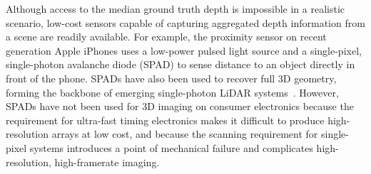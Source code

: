 




Although access to the median ground truth depth is impossible in a realistic scenario, low-cost sensors capable of capturing aggregated depth information from a scene are readily available. For example, the proximity sensor on recent generation Apple iPhones uses a low-power pulsed light source and a single-pixel, single-photon avalanche diode (SPAD) to sense distance to an object directly in front of the phone. SPADs have also been used to recover full 3D geometry, forming the backbone of emerging single-photon LiDAR systems~\cite{Kirmani:2014,Li:2019,pawlikowska2017single}. However, SPADs have not been used for 3D imaging on consumer electronics because the requirement for ultra-fast timing electronics makes it difficult to produce high-resolution arrays at low cost, and because the scanning requirement for single-pixel systems introduces a point of mechanical failure and complicates high-resolution, high-framerate imaging. 

